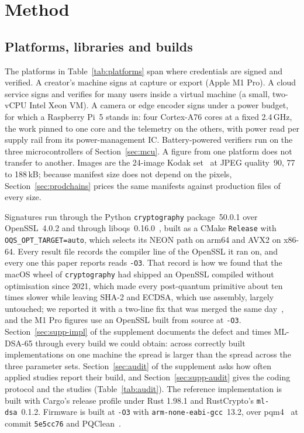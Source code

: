 \section{Method}
\label{sec:method}

\subsection{Platforms, libraries and builds}

The platforms in Table~\ref{tab:platforms} span where credentials are signed
and verified. A creator's machine signs at capture or export (Apple M1 Pro). A
cloud service signs and verifies for many users inside a virtual machine (a
small, two-vCPU Intel Xeon VM). A camera or edge encoder signs under a power
budget, for which a Raspberry Pi~5 stands in: four Cortex-A76 cores at a fixed
2.4\,GHz, the work pinned to one core and the telemetry on the others, with
power read per supply rail from its power-management IC. Battery-powered
verifiers run on the three microcontrollers of Section~\ref{sec:mcu}. A figure
from one platform does not transfer to another. Images are the 24-image Kodak
set~\cite{kodak} at JPEG quality~90, 77 to 188\,kB; because manifest size does
not depend on the pixels, Section~\ref{sec:prodchains} prices the same
manifests against production files of every size.



Signatures run through the Python \texttt{cryptography} package~50.0.1 over
OpenSSL~4.0.2 and through liboqs~0.16.0~\cite{stebila2016}, built as a CMake
\texttt{Release} with \texttt{OQS\_OPT\_TARGET=auto}, which selects its NEON
path on arm64 and AVX2 on x86-64. Every result file records the compiler line
of the OpenSSL it ran on, and every one this paper reports reads \texttt{-O3}. That record is
how we found that the macOS wheel of \texttt{cryptography} had shipped an
OpenSSL compiled without optimisation since 2021, which made every
post-quantum primitive about ten times slower while leaving SHA-2 and ECDSA,
which use assembly, largely untouched; we reported it with a two-line fix that was
merged the same day~\cite{pyca_issue15702,pyca_infra796}, and the M1 Pro
figures use an OpenSSL built from source at \texttt{-O3}. Section~\ref{sec:supp-impl} of the
supplement documents the defect and times ML-DSA-65 through every build we
could obtain: across correctly built implementations on one machine the
spread is larger than the spread across the three parameter sets.
Section~\ref{sec:audit} of the supplement asks how often applied studies
report their build, and Section~\ref{sec:supp-audit} gives the coding
protocol and the \NauditN{} studies (Table~\ref{tab:audit}). The
reference implementation is built with Cargo's release profile under Rust
1.98.1 and RustCrypto's \texttt{ml-dsa}~0.1.2. Firmware is built at
\texttt{-O3} with \texttt{arm-none-eabi-gcc}~13.2, over pqm4~\cite{pqm4} at
commit \texttt{5e5cc76} and PQClean~\cite{kannwischer2022pqclean}.

